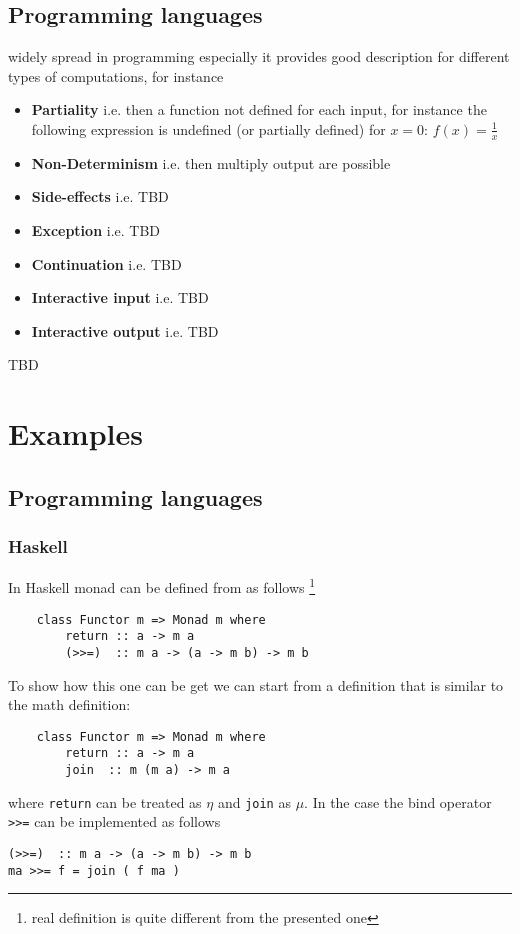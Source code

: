 \subsection{Programming languages}
 widely spread in programming
especially it provides good description for different types of
computations, for instance \cite{bib:Moggi91, bib:milewski2018category} 
\begin{itemize}
\item \textbf{Partiality} i.e. then a function not defined for each input, for
  instance the following expression is undefined (or partially
  defined) for $x = 0$: $f(x) = \frac{1}{x}$
\item \textbf{Non-Determinism} i.e. then multiply output are possible
\item \textbf{Side-effects} i.e. TBD
\item \textbf{Exception} i.e. TBD
\item \textbf{Continuation} i.e. TBD
\item \textbf{Interactive input} i.e. TBD
\item \textbf{Interactive output} i.e. TBD
\end{itemize}

TBD

\section{Examples}

\subsection{Programming languages}

\subsubsection{Haskell}

\begin{example}
\label{ex:monad_haskell}
In Haskell monad can be defined from  as follows 
\footnote{real definition is quite different from the presented one}
\begin{verbatim}
    class Functor m => Monad m where
        return :: a -> m a
        (>>=)  :: m a -> (a -> m b) -> m b
\end{verbatim} 

To show how this one can be get we can start from a definition that is
similar to the math definition:
\begin{verbatim}
    class Functor m => Monad m where
        return :: a -> m a
        join  :: m (m a) -> m a
\end{verbatim} 
where \texttt{return} can be treated as $\eta$ and 
\texttt{join} as $\mu$. In the case the bind operator 
\texttt{>>=} can be implemented as follows
\begin{verbatim}
(>>=)  :: m a -> (a -> m b) -> m b
ma >>= f = join ( f ma )
\end{verbatim} 

\end{example}

